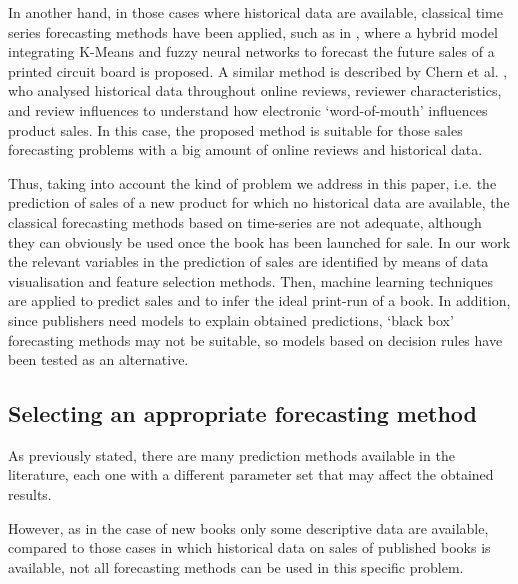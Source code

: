 \documentclass[a4paper,10pt,twocolumn,preprint,3p]{elsarticle}
\begin{document}
In another hand, in those cases where historical data are available, classical time series forecasting methods have been applied, such as in \cite{Chang2009}, 
where a hybrid model integrating K-Means and fuzzy neural networks to forecast 
the future sales of a printed circuit board is proposed.
A similar method is described by Chern et al. \cite{ChernWSF15}, who analysed 
historical data throughout online reviews, reviewer characteristics, and review 
influences to understand how electronic `word-of-mouth' influences product sales. 
In this case, the proposed method is suitable for those sales forecasting problems 
with a big amount of online reviews and historical data.

Thus, taking into account the kind of problem we address in this
paper, i.e. the prediction of sales of a new product for which no
historical data are available, the classical forecasting methods based
on time-series are not adequate, although they can obviously be used once 
the book has been launched for sale. 
In our work the relevant variables in the prediction of sales are identified
by means of data visualisation and feature selection methods. 
Then, machine learning techniques are applied to predict sales and to infer 
the ideal print-run of a book.
In addition, since publishers need models to explain obtained predictions, 
`black box' forecasting methods may not be suitable, so models based
on decision rules have been tested as an alternative. 



\subsection{Selecting an appropriate forecasting method}
\label{subsec:select_method}

As previously stated, there are many prediction methods available in the 
literature, each one with a different parameter set that may affect the 
obtained results.

However, as in the case of new books only some descriptive data are available,
compared to those cases in which historical data on sales of published books 
is available, not all forecasting methods can be used in this specific problem.
\end{document}
